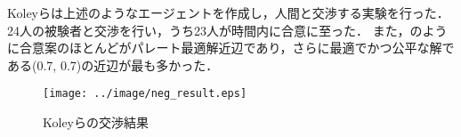 Koleyらは上述のようなエージェントを作成し，人間と交渉する実験を行った．
24人の被験者と交渉を行い，うち23人が時間内に合意に至った．
また，のように合意案のほとんどがパレート最適解近辺であり，さらに最適でかつ公平な解である(0.7, 0.7)の近辺が最も多かった．
\begin{figure}[tb]
    \centering
    \texttt{[image: ../image/neg\_result.eps]}
    \caption[Koleyらの交渉結果]{Koleyらの交渉結果 \protect \footnotemark}
    \label{fig:koley_result}
\end{figure}

